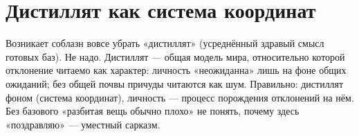 \section{Дистиллят как система координат}

Возникает соблазн вовсе убрать «дистиллят» (усреднённый здравый смысл готовых баз).
Не надо. Дистиллят — общая модель мира, относительно которой отклонение читаемо как
характер: личность «неожиданна» лишь на фоне общих ожиданий; без общей почвы
причуды читаются как шум. Правильно: дистиллят фоном (система координат), личность —
процесс порождения отклонений на нём. Без базового «разбитая вещь обычно плохо» не
понять, почему здесь «поздравляю» — уместный сарказм.
